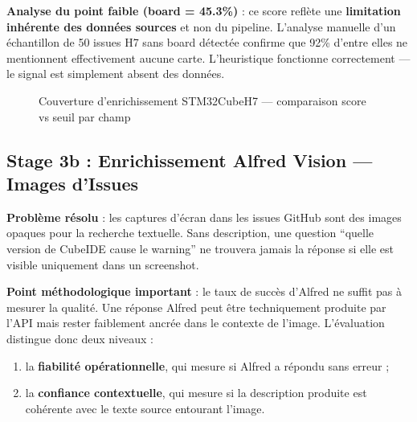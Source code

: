 \documentclass[12pt,a4paper]{report}
\begin{document}
\textbf{Analyse du point faible (board = 45.3\%)} : ce score reflète une \textbf{limitation inhérente des données sources} et non du pipeline. L'analyse manuelle d'un échantillon de 50 issues H7 sans board détectée confirme que 92\% d'entre elles ne mentionnent effectivement aucune carte. L'heuristique fonctionne correctement --- le signal est simplement absent des données.

\begin{figure}[H]
\centering
{}
\caption{Couverture d'enrichissement STM32CubeH7 --- comparaison score vs seuil par champ}
\label{fig:eval_enrichment_chart_dead}
\end{figure}

\subsection{Stage 3b : Enrichissement Alfred Vision --- Images d'Issues}
\label{sec:eval_alfred_images}

\textbf{Problème résolu} : les captures d'écran dans les issues GitHub sont des images opaques pour la recherche textuelle. Sans description, une question ``quelle version de CubeIDE cause le warning'' ne trouvera jamais la réponse si elle est visible uniquement dans un screenshot.

\textbf{Point méthodologique important} : le taux de succès d'Alfred ne suffit pas à mesurer la qualité. Une réponse Alfred peut être techniquement produite par l'API mais rester faiblement ancrée dans le contexte de l'image. L'évaluation distingue donc deux niveaux :
\begin{enumerate}
  \item la \textbf{fiabilité opérationnelle}, qui mesure si Alfred a répondu sans erreur ;
  \item la \textbf{confiance contextuelle}, qui mesure si la description produite est cohérente avec le texte source entourant l'image.
\end{enumerate}
\end{document}
